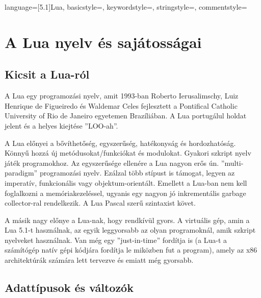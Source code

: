 

{
	language=[5.1]Lua,
	basicstyle=\ttfamily,
	keywordstyle=\color{orange},
	stringstyle=\color{olivegreen},
	commentstyle=\color{black!50}
}

\lstset{style=myLuastyle}

\chapter{A Lua nyelv és sajátosságai}
\label{chap:02_lua}

\section{Kicsit a Lua-ról}
\label{sec:about_lua}

A Lua egy programozási nyelv, amit 1993-ban Roberto Ierusalimschy, Luiz Henrique de Figueiredo és Waldemar Celes fejlesztett a Pontifical Catholic University of Rio de Janeiro egyetemen Brazíliában. A Lua portugálul holdat jelent és a helyes kiejtése ''LOO-ah''. 

A Lua előnyei a bővíthetőség, egyszerűség, hatékonyság és hordozhatóság. Könnyű hozzá új metódusokat/funkciókat és modulokat. Gyakori szkript nyelv játék programokhoz. Az egyszerűsége ellenére a Lua nagyon erős ún. ''multi-paradigm'' programozási nyelv. Ezálzal több stípust is támogat, legyen az imperatív, funkcionális vagy objektum-orientált. Emellett a Lua-ban nem kell foglalkozni a memóriakezeléssel, ugyanis egy nagyon jó inkrementális garbage collector-ral rendelkezik. A Lua Pascal szerű szintaxist követ.

A másik nagy előnye a Lua-nak, hogy rendkívül gyors. A virtuális gép, amin a Lua 5.1-t használnak, az egyik leggyorsabb az olyan programoknál, amik szkript nyelveket használnak. Van még egy ''just-in-time'' fordítja is (a Lua-t a számítógép natív gépi kódjára fordítja le miközben fut a program), amely az x86 architektúrák számára lett tervezve és emiatt még gyorsabb.


\section{Adattípusok és változók}
\label{sec:lTypes}

